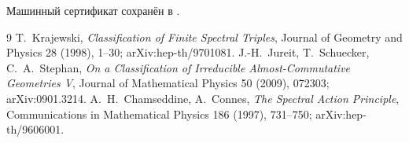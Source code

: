 Машинный сертификат сохранён в
.

\begin{thebibliography}{9}
T.~Krajewski,
\emph{Classification of Finite Spectral Triples},
Journal of Geometry and Physics 28 (1998), 1--30;
arXiv:hep-th/9701081.
J.-H.~Jureit, T.~Schuecker, C.~A.~Stephan,
\emph{On a Classification of Irreducible Almost-Commutative Geometries V},
Journal of Mathematical Physics 50 (2009), 072303; arXiv:0901.3214.
A.~H.~Chamseddine, A.~Connes,
\emph{The Spectral Action Principle},
Communications in Mathematical Physics 186 (1997), 731--750;
arXiv:hep-th/9606001.
\end{thebibliography}